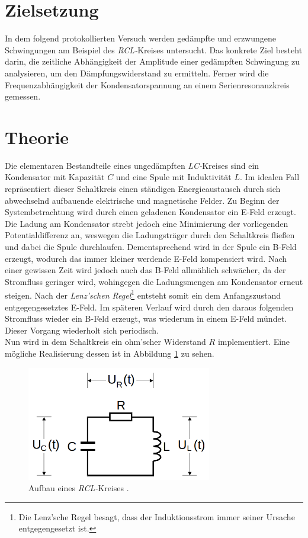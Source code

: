 


\section{Zielsetzung}

In dem folgend protokollierten Versuch werden gedämpfte und erzwungene Schwingungen am Beispiel des \emph{RCL-}Kreises
untersucht. Das konkrete Ziel besteht darin, die zeitliche Abhängigkeit der Amplitude einer gedämpften Schwingung zu
analysieren, um den Dämpfungswiderstand zu ermitteln. Ferner wird die Frequenzabhängigkeit der Kondensatorspannung an einem
Serienresonanzkreis gemessen.

\section{Theorie}
\label{sec:Theorie}

Die elementaren Bestandteile eines ungedämpften \emph{LC-}Kreises sind ein Kondensator mit Kapazität $C$ und eine 
Spule mit Induktivität $L$. Im idealen Fall repräsentiert dieser Schaltkreis einen ständigen Energieaustausch durch 
sich abwechselnd aufbauende elektrische und magnetische Felder. Zu Beginn der Systembetrachtung wird durch einen 
geladenen Kondensator ein E-Feld erzeugt. Die Ladung am Kondensator strebt jedoch eine Minimierung der vorliegenden 
Potentialdifferenz an, weswegen die Ladungsträger durch den Schaltkreis fließen und dabei die Spule durchlaufen. 
Dementsprechend wird in der Spule ein B-Feld erzeugt, wodurch das immer kleiner werdende E-Feld kompensiert wird. Nach
einer gewissen Zeit wird jedoch auch das B-Feld allmählich schwächer, da der Stromfluss geringer wird, wohingegen die 
Ladungsmengen am Kondensator erneut steigen. Nach der \emph{Lenz'schen Regel}\footnote{Die Lenz'sche Regel besagt, dass der
Induktionsstrom immer seiner Ursache entgegengesetzt ist.} entsteht somit ein dem Anfangszustand entgegengesetztes E-Feld.
Im späteren Verlauf wird durch den daraus folgenden Stromfluss wieder ein B-Feld erzeugt, was wiederum in einem E-Feld 
mündet. Dieser Vorgang wiederholt sich periodisch.\\
Nun wird in dem Schaltkreis ein ohm'scher Widerstand $R$ implementiert. Eine mögliche Realisierung dessen ist in Abbildung 
\ref{fig:RCL-Kreis} zu sehen.

\begin{figure}
    \centering
    \includegraphics[height=5cm]{RCL_Kreis.png}
    \caption{Aufbau eines \emph{RCL-}Kreises \cite{Versuchsanleitung_v354}.}
    \label{fig:RCL-Kreis}
\end{figure}

